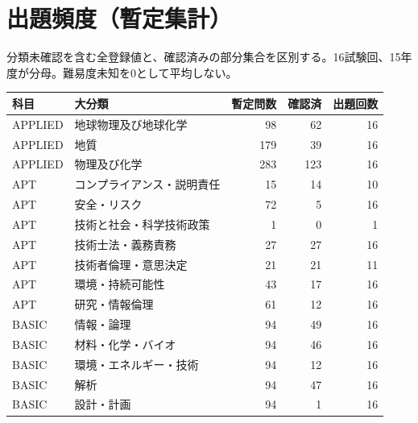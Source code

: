 \chapter{出題頻度（暫定集計）}
分類未確認を含む全登録値と、確認済みの部分集合を区別する。16試験回、15年度が分母。難易度未知を0として平均しない。
\begin{longtable}{p{.16\linewidth}p{.42\linewidth}rrr}
科目 & 大分類 & 暫定問数 & 確認済 & 出題回数\\\hline
APPLIED & 地球物理及び地球化学 & 98 & 62 & 16\\
APPLIED & 地質 & 179 & 39 & 16\\
APPLIED & 物理及び化学 & 283 & 123 & 16\\
APT & コンプライアンス・説明責任 & 15 & 14 & 10\\
APT & 安全・リスク & 72 & 5 & 16\\
APT & 技術と社会・科学技術政策 & 1 & 0 & 1\\
APT & 技術士法・義務責務 & 27 & 27 & 16\\
APT & 技術者倫理・意思決定 & 21 & 21 & 11\\
APT & 環境・持続可能性 & 43 & 17 & 16\\
APT & 研究・情報倫理 & 61 & 12 & 16\\
BASIC & 情報・論理 & 94 & 49 & 16\\
BASIC & 材料・化学・バイオ & 94 & 46 & 16\\
BASIC & 環境・エネルギー・技術 & 94 & 12 & 16\\
BASIC & 解析 & 94 & 47 & 16\\
BASIC & 設計・計画 & 94 & 1 & 16\\
\end{longtable}
